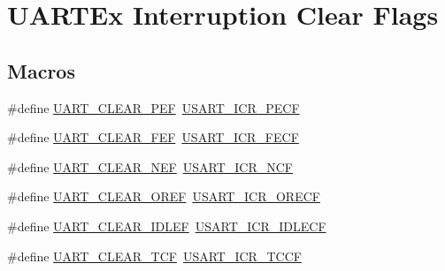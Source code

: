 \hypertarget{group___u_a_r_t___i_t___c_l_e_a_r___flags}{}\section{U\+A\+R\+T\+Ex Interruption Clear Flags}
\label{group___u_a_r_t___i_t___c_l_e_a_r___flags}
\subsection*{Macros}
\begin{DoxyCompactItemize}
\item 
\#define \hyperlink{group___u_a_r_t___i_t___c_l_e_a_r___flags_ga9c2aef8048dd09ea5e72d69c63026f02}{U\+A\+R\+T\+\_\+\+C\+L\+E\+A\+R\+\_\+\+P\+EF}~\hyperlink{group___peripheral___registers___bits___definition_ga404185136eb68f679e82e0187d66e411}{U\+S\+A\+R\+T\+\_\+\+I\+C\+R\+\_\+\+P\+E\+CF}
\item 
\#define \hyperlink{group___u_a_r_t___i_t___c_l_e_a_r___flags_ga2040edf7a1daa2e9f352364e285ef5c3}{U\+A\+R\+T\+\_\+\+C\+L\+E\+A\+R\+\_\+\+F\+EF}~\hyperlink{group___peripheral___registers___bits___definition_ga8400b4500c41800e5f18fc7291a64c9f}{U\+S\+A\+R\+T\+\_\+\+I\+C\+R\+\_\+\+F\+E\+CF}
\item 
\#define \hyperlink{group___u_a_r_t___i_t___c_l_e_a_r___flags_gad5b9aafb495296d917a5d85e63383396}{U\+A\+R\+T\+\_\+\+C\+L\+E\+A\+R\+\_\+\+N\+EF}~\hyperlink{group___peripheral___registers___bits___definition_gad50b0d2460df1cbddd9576c2f4637312}{U\+S\+A\+R\+T\+\_\+\+I\+C\+R\+\_\+\+N\+CF}
\item 
\#define \hyperlink{group___u_a_r_t___i_t___c_l_e_a_r___flags_ga3bc97b70293f9a7bf8cc21a74094afad}{U\+A\+R\+T\+\_\+\+C\+L\+E\+A\+R\+\_\+\+O\+R\+EF}~\hyperlink{group___peripheral___registers___bits___definition_ga375f76b0670ffeb5d2691592d9e7c422}{U\+S\+A\+R\+T\+\_\+\+I\+C\+R\+\_\+\+O\+R\+E\+CF}
\item 
\#define \hyperlink{group___u_a_r_t___i_t___c_l_e_a_r___flags_ga75ee9be0ac2236931ef3d9514e7dedf4}{U\+A\+R\+T\+\_\+\+C\+L\+E\+A\+R\+\_\+\+I\+D\+L\+EF}~\hyperlink{group___peripheral___registers___bits___definition_ga9d4d7675c0d36ce4347c3509d27c0760}{U\+S\+A\+R\+T\+\_\+\+I\+C\+R\+\_\+\+I\+D\+L\+E\+CF}
\item 
\#define \hyperlink{group___u_a_r_t___i_t___c_l_e_a_r___flags_gadfbfe4df408d1d09ff2adc1ddad3de09}{U\+A\+R\+T\+\_\+\+C\+L\+E\+A\+R\+\_\+\+T\+CF}~\hyperlink{group___peripheral___registers___bits___definition_gacf92ea54425a962dde662b10b61d0250}{U\+S\+A\+R\+T\+\_\+\+I\+C\+R\+\_\+\+T\+C\+CF}

\end{DoxyCompactItemize}
